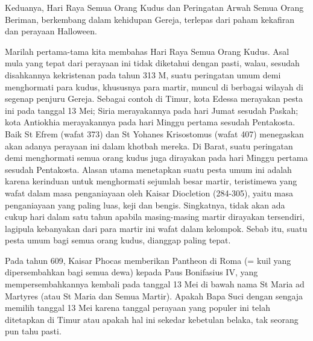


Keduanya, Hari Raya Semua Orang Kudus dan Peringatan Arwah Semua Orang Beriman, berkembang dalam kehidupan Gereja, terlepas dari paham kekafiran dan perayaan Halloween.

Marilah pertama-tama kita membahas Hari Raya Semua Orang Kudus. Asal mula yang tepat dari perayaan ini tidak diketahui dengan pasti, walau, sesudah disahkannya kekristenan pada tahun 313 M, suatu peringatan umum demi menghormati para kudus, khususnya para martir, muncul di berbagai wilayah di segenap penjuru Gereja. Sebagai contoh di Timur, kota Edessa merayakan pesta ini pada tanggal 13 Mei; Siria merayakannya pada hari Jumat sesudah Paskah; kota Antiokhia merayakannya pada hari Minggu pertama sesudah Pentakosta. Baik St Efrem (wafat 373) dan St Yohanes Krisostomus (wafat 407) menegaskan akan adanya perayaan ini dalam khotbah mereka. Di Barat, suatu peringatan demi menghormati semua orang kudus juga dirayakan pada hari Minggu pertama sesudah Pentakosta. Alasan utama menetapkan suatu pesta umum ini adalah karena kerinduan untuk menghormati sejumlah besar martir, teristimewa yang wafat dalam masa penganiayaan oleh Kaisar Diocletion (284-305), yaitu masa penganiayaan yang paling luas, keji dan bengis. Singkatnya, tidak akan ada cukup hari dalam satu tahun apabila masing-masing martir dirayakan tersendiri, lagipula kebanyakan dari para martir ini wafat dalam kelompok. Sebab itu, suatu pesta umum bagi semua orang kudus, dianggap paling tepat.

Pada tahun 609, Kaisar Phocas memberikan Pantheon di Roma (= kuil yang dipersembahkan bagi semua dewa) kepada Paus Bonifasius IV, yang mempersembahkannya kembali pada tanggal 13 Mei di bawah nama St Maria ad Martyres (atau St Maria dan Semua Martir). Apakah Bapa Suci dengan sengaja memilih tanggal 13 Mei karena tanggal perayaan yang populer ini telah ditetapkan di Timur atau apakah hal ini sekedar kebetulan belaka, tak seorang pun tahu pasti.


